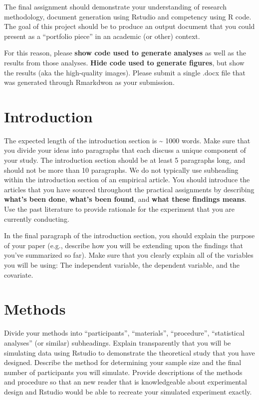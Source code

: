 \documentclass[
]{book}
\begin{document}
The final assignment should demonstrate your understanding of research methodology, document generation using Rstudio and competency using R code. The goal of this project should be to produce an output document that you could present as a ``portfolio piece'' in an academic (or other) context.

For this reason, please \textbf{show code used to generate analyses} as well as the results from those analyses. \textbf{Hide code used to generate figures}, but show the results (aka the high-quality images). Please submit a single .docx file that was generated through Rmarkdwon as your submission.

\section*{Introduction}\label{introduction}

The expected length of the introduction section is \textasciitilde{} 1000 words. Make sure that you divide your ideas into paragraphs that each discuss a unique component of your study. The introduction section should be at least 5 paragraphs long, and should not be more than 10 paragraphs. We do not typically use subheading within the introduction section of an empirical article. You should introduce the articles that you have sourced throughout the practical assignments by describing \textbf{what's been done}, \textbf{what's been found}, and \textbf{what these findings means}. Use the past literature to provide rationale for the experiment that you are currently conducting.

In the final paragraph of the introduction section, you should explain the purpose of your paper (e.g., describe how you will be extending upon the findings that you've summarized so far). Make sure that you clearly explain all of the variables you will be using: The independent variable, the dependent variable, and the covariate.

\section*{Methods}\label{methods}

Divide your methods into ``participants'', ``materials'', ``procedure'', ``statistical analyses'' (or similar) subheadings. Explain transparently that you will be simulating data using Rstudio to demonstrate the theoretical study that you have designed. Describe the method for determining your sample size and the final number of participants you will simulate. Provide descriptions of the methods and procedure so that an new reader that is knowledgeable about experimental design and Rstudio would be able to recreate your simulated experiment exactly.
\end{document}
